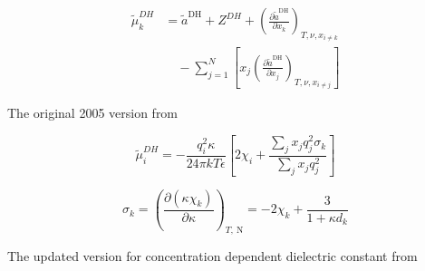\documentclass[12pt, letterpaper]{article}
\begin{document}
\begin{equation}
    \begin{aligned}
        \tilde{\mu}^{DH}_{k}
        &=\tilde{a}^{\mathrm{DH}} + Z^{DH}
        +\left(\frac{\partial\tilde{a}^{\mathrm{DH}}}{\partial x_{k}}\right)_{T,\nu,x_{i\neq k}}
        \\
        &\quad -\sum_{j=1}^{N}\left[x_{j}\left(\frac{\partial\tilde{a}^{\mathrm{DH}}}{\partial x_{j}}\right)_{T,\nu,x_{i\neq j}}\right]
    \end{aligned}
    \label{eq:mu_dh}
\end{equation}

The original 2005 version from~\cite{Cameretti2005}


\begin{equation}
    \tilde{\mu}^{DH}_{i}= -\frac{q_{i}^2 \kappa}{24 \pi k T \epsilon}\left[2 \chi_{i}+\frac{\sum_{j} x_{j} q_{j}^2 \sigma_{k}}{\sum_{j} x_{j} q_{j}^2}\right]
    \label{eq:mu_dh_2005}
\end{equation}


\begin{equation}
    \sigma_{k}=\left(\frac{\partial\left(\kappa \chi_{k}\right)}{\partial \kappa}\right)_{T, \mathrm{~N}}=-2 \chi_{k}+\frac{3}{1+\kappa d_{k}}
    \label{eq:sigma_dh_2005}
\end{equation}

The updated version for concentration dependent dielectric constant from~\cite{Bulow2019}

\end{document}
